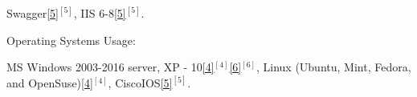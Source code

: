 \begin{cventries}
{\begin{cvitems}
{        \textcolor{rainbowcolor-green}{Swagger\ref{5}{$^{[5]}$}},        
        \textcolor{rainbowcolor-green}{IIS 6-8\ref{5}{$^{[5]}$}}.%
		}
      \end{cvitems}
    }  
    
%    
%    
  \cventry
    {Operating Systems Usage:} %
    {} 
    {} 
    {} 
    {
      \vspace{0.1cm}
      \begin{cvitems} %
        \item[] {
        \textcolor{rainbowcolor-orange}{MS Windows 2003-2016 server, XP - 10\ref{4}{$^{[4]}$}\ref{6}{$^{[6]}$}}, 
        \textcolor{rainbowcolor-orange}{Linux (Ubuntu, Mint, Fedora, and OpenSuse)\ref{4}{$^{[4]}$}},
        \textcolor{rainbowcolor-orange}{CiscoIOS\ref{5}{$^{[5]}$}}.} 
      \end{cvitems}
    }  
  \vspace{-0.6cm} 
    


\end{cventries}
